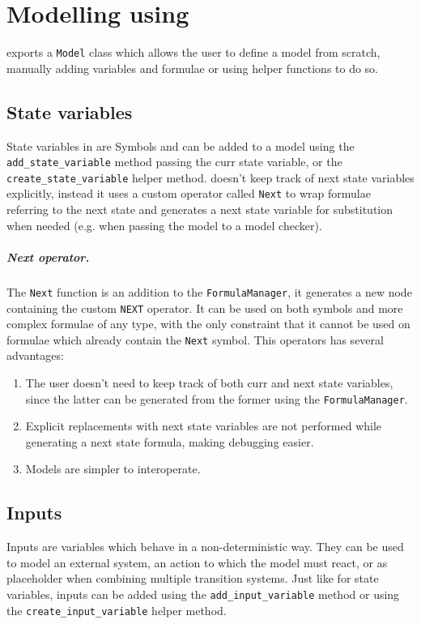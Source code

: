 \chapter{Modelling using \pyvmt{}}
\pyvmt{} exports a \texttt{Model} class which allows the user to define a model from scratch, manually adding variables and formulae or using helper functions to do so.


\section{State variables}
State variables in \pyvmt{} are \pysmt{} Symbols and can be added to a model using the \texttt{add\_state\_variable} method passing the curr state variable, or the \texttt{create\_state\_variable} helper method.
\pyvmt{} doesn't keep track of next state variables explicitly, instead it uses a custom operator called \texttt{Next} to wrap formulae referring to the next state and generates a next state variable for substitution when needed (e.g. when passing the model to a model checker).

\paragraph*{Next operator.} The \texttt{Next} function is an addition to the \pysmt{} \texttt{FormulaManager}, it generates a new node containing the custom \texttt{NEXT} operator. It can be used on both symbols and more complex formulae of any type, with the only constraint that it cannot be used on formulae which already contain the \texttt{Next} symbol. This operators has several advantages:
\begin{enumerate}
    \item The user doesn't need to keep track of both curr and next state variables, since the latter can be generated from the former using the \texttt{FormulaManager}.
    \item Explicit replacements with next state variables are not performed while generating a next state formula, making debugging easier.
    \item Models are simpler to interoperate.
\end{enumerate}

\section{Inputs}
Inputs are variables which behave in a non-deterministic way. They can be used to model an external system, an action to which the model must react, or as placeholder when combining multiple transition systems.
Just like for state variables, inputs can be added using the \texttt{add\_input\_variable} method or using the \texttt{create\_input\_variable} helper method.

